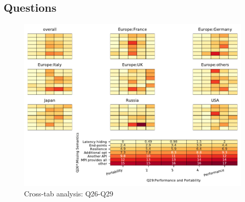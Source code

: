 
\subsection{Questions}


\begin{figure}
\begin{center}
\includegraphics[width=12cm]{../pdfs/Q26-Q29.pdf}
\caption{Cross-tab analysis: Q26-Q29}
\label{fig:Q26-Q29}
\end{center}
\end{figure}
